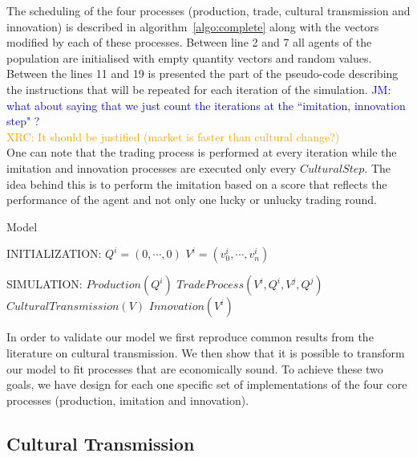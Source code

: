 \documentclass{wscpaperproc}
\newcommand{\memo}[2]{\textcolor{#1}{#2}}
\newcommand{\jm}[1]{\memo{blue}{JM: #1\\}}
\newcommand{\xrc}[1]{\memo{orange}{XRC: #1\\}}
\begin{document}
The scheduling of the four processes (production, trade, cultural transmission and innovation) is described in algorithm~\ref{algo:complete} along with the vectors modified by each of these processes. Between line 2 and 7 all agents of the population are initialised with empty quantity vectors and random values. Between the lines 11 and 19 is presented the part of the pseudo-code describing the instructions that will be repeated for each iteration of the simulation. 
\jm{what about saying that we just count the iterations at the ``imitation, innovation step" ?}
\xrc{It should be justified (market is faster than cultural change?)}
One can note that the trading process is performed at every iteration while the imitation and innovation processes are executed only every $CulturalStep$. The idea behind this is to perform the imitation based on a score that reflects the performance of the agent and not only one lucky or unlucky trading round. 

\begin{algorithm}
\caption{Model}
\label{algo:complete}
	\begin{algorithmic}[1]
	\scriptsize
	\State INITIALIZATION: 
			 
				\State $Q^i = (0, \cdots, 0)$
				\State $V^i = (v^i_0, \cdots, v^i_n)$ 
			\EndFor
		\EndFor

	\State SIMULATION:
				\State $Production(Q^i)$
					\State $TradeProcess(V^i,Q^i,V^j,Q^j)$
				\EndFor				
					\State $CulturalTransmission(V)$
					\State $Innovation(V^i)$
				\EndIf
			\EndFor
		\EndLoop
\end{algorithmic}
\end{algorithm}


In order to validate our model we first reproduce common results from the literature on cultural transmission. We then show that it is possible to transform our model to fit processes that are economically sound. To achieve these two goals, we have design for each one specific set of implementations of the four core processes (production, imitation and innovation). 

\subsection{Cultural Transmission}\label{sec:culturalTrans}
\end{document}
